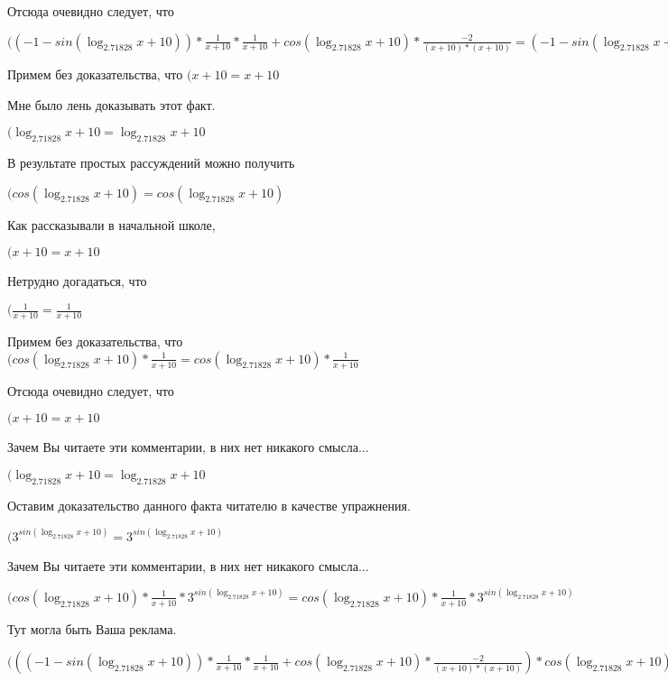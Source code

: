 \documentclass[12pt,a4paper,fleqn]{article}
\theoremstyle{definition}
\begin{document}
Отсюда очевидно следует, что

$(( -1  - sin(\log_{ 2.71828 }{ x  +  10 })) * \frac{ 1 }{ x  +  10 }
 * \frac{ 1 }{ x  +  10 }
 + cos(\log_{ 2.71828 }{ x  +  10 }) * \frac{ -2 }{( x  +  10 ) * ( x  +  10 )}
 = ( -1  - sin(\log_{ 2.71828 }{ x  +  10 })) * \frac{ 1 }{ x  +  10 }
 * \frac{ 1 }{ x  +  10 }
 + cos(\log_{ 2.71828 }{ x  +  10 }) * \frac{ -2 }{( x  +  10 ) * ( x  +  10 )}
$

Примем без доказательства, что
$( x  +  10  =  x  +  10 $

Мне было лень доказывать этот факт.

$(\log_{ 2.71828 }{ x  +  10 } = \log_{ 2.71828 }{ x  +  10 }$

В результате простых рассуждений можно получить

$(cos(\log_{ 2.71828 }{ x  +  10 }) = cos(\log_{ 2.71828 }{ x  +  10 })$

Как рассказывали в начальной школе,

$( x  +  10  =  x  +  10 $

Нетрудно догадаться, что

$(\frac{ 1 }{ x  +  10 }
 = \frac{ 1 }{ x  +  10 }
$

Примем без доказательства, что
$(cos(\log_{ 2.71828 }{ x  +  10 }) * \frac{ 1 }{ x  +  10 }
 = cos(\log_{ 2.71828 }{ x  +  10 }) * \frac{ 1 }{ x  +  10 }
$

Отсюда очевидно следует, что

$( x  +  10  =  x  +  10 $

Зачем Вы читаете эти комментарии, в них нет никакого смысла...

$(\log_{ 2.71828 }{ x  +  10 } = \log_{ 2.71828 }{ x  +  10 }$

Оставим доказательство данного факта читателю в качестве упражнения.

$({ 3 }^{sin(\log_{ 2.71828 }{ x  +  10 })} = { 3 }^{sin(\log_{ 2.71828 }{ x  +  10 })}$

Зачем Вы читаете эти комментарии, в них нет никакого смысла...

$(cos(\log_{ 2.71828 }{ x  +  10 }) * \frac{ 1 }{ x  +  10 }
 * { 3 }^{sin(\log_{ 2.71828 }{ x  +  10 })} = cos(\log_{ 2.71828 }{ x  +  10 }) * \frac{ 1 }{ x  +  10 }
 * { 3 }^{sin(\log_{ 2.71828 }{ x  +  10 })}$

Тут могла быть Ваша реклама.

$((( -1  - sin(\log_{ 2.71828 }{ x  +  10 })) * \frac{ 1 }{ x  +  10 }
 * \frac{ 1 }{ x  +  10 }
 + cos(\log_{ 2.71828 }{ x  +  10 }) * \frac{ -2 }{( x  +  10 ) * ( x  +  10 )}
) * cos(\log_{ 2.71828 }{ x  +  10 }) * \frac{ 1 }{ x  +  10 }
 * { 3 }^{sin(\log_{ 2.71828 }{ x  +  10 })} = (( -1  - sin(\log_{ 2.71828 }{ x  +  10 })) * \frac{ 1 }{ x  +  10 }
 * \frac{ 1 }{ x  +  10 }
 + cos(\log_{ 2.71828 }{ x  +  10 }) * \frac{ -2 }{( x  +  10 ) * ( x  +  10 )}
) * cos(\log_{ 2.71828 }{ x  +  10 }) * \frac{ 1 }{ x  +  10 }
 * { 3 }^{sin(\log_{ 2.71828 }{ x  +  10 })}$
\end{document}
